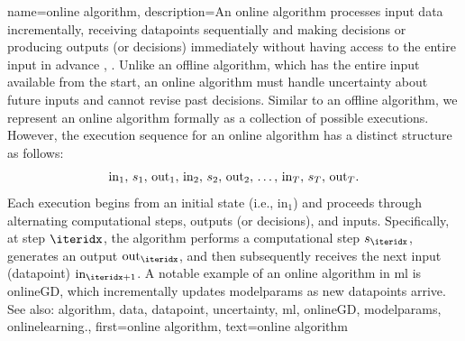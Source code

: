 {name={online algorithm},
	description={An online \gls{algorithm} processes input \gls{data} incrementally, 
		receiving \glspl{datapoint} sequentially and making decisions or producing outputs (or decisions) immediately 
		without having access to the entire input in advance \cite{PredictionLearningGames}, \cite{HazanOCO}. 
		Unlike an offline \gls{algorithm}, which has the entire input available from the start, an online \gls{algorithm} 
		must handle \gls{uncertainty} about future inputs and cannot revise past decisions. Similar to an 
		offline \gls{algorithm}, we represent an online \gls{algorithm} formally as a collection of possible 
		executions. However, the execution sequence for an online \gls{algorithm} has a distinct structure as follows:
		$${\rm in}_{1}, \,s_1, \,{\rm out}_{1}, \,{\rm in}_{2}, \,s_2, \,{\rm out}_{2}, \,\ldots, \,{\rm in}_{T}, \,s_T, \,{\rm out}_{T}.$$ 
		Each execution begins from an initial state (i.e., \(\text{in}_{1}\)) and proceeds through alternating 
		computational steps, outputs (or decisions), and inputs. Specifically, at step \(\iteridx\), 
		the \gls{algorithm} performs a computational step \(s_{\iteridx}\), generates an output \(\text{out}_{\iteridx}\), 
		and then subsequently receives the next input (\gls{datapoint}) \(\text{in}_{\iteridx+1}\). A 
		notable example of an online \gls{algorithm} in \gls{ml} is \gls{onlineGD}, which incrementally 
		updates \glspl{modelparam} as new \glspl{datapoint} arrive. 
					\\ 
		See also: \gls{algorithm}, \gls{data}, \gls{datapoint}, \gls{uncertainty}, \gls{ml}, \gls{onlineGD}, \glspl{modelparam}, \gls{onlinelearning}.},
	first={online algorithm},
	text={online algorithm} 
}



